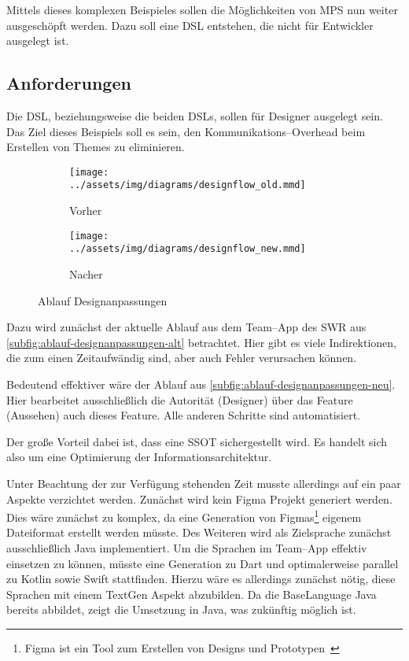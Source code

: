 Mittels dieses komplexen Beispieles sollen die Möglichkeiten von \ac{MPS} nun weiter ausgeschöpft werden.
Dazu soll eine \ac{DSL} entstehen, die nicht für Entwickler ausgelegt ist.

\subsection{Anforderungen}\label{subsec:anforderungen}
Die \ac{DSL}, beziehungsweise die beiden \acp{DSL}, sollen für Designer ausgelegt sein.
Das Ziel dieses Beispiels soll es sein, den Kommunikations--Overhead beim Erstellen von Themes zu eliminieren.
\begin{figure}[ht]
    \begin{subfigure}[c]{0.5\textwidth}
        \begin{center}
            \texttt{[image: ../assets/img/diagrams/designflow\_old.mmd]}
        \end{center}
        \caption{Vorher}
        \label{subfig:ablauf-designanpassungen-alt}
    \end{subfigure}
    \begin{subfigure}[c]{0.5\textwidth}
        \begin{center}
            \texttt{[image: ../assets/img/diagrams/designflow\_new.mmd]}
        \end{center}
        \caption{Nacher}
        \label{subfig:ablauf-designanpassungen-neu}
    \end{subfigure}
    \caption{Ablauf Designanpassungen}
    \label{fig:ablauf-designanpassungen}
\end{figure}

Dazu wird zunächst der aktuelle Ablauf aus dem Team--App des \ac{SWR} aus \autoref{subfig:ablauf-designanpassungen-alt} betrachtet.
Hier gibt es viele Indirektionen, die zum einen Zeitaufwändig sind, aber auch Fehler verursachen können.

Bedeutend effektiver wäre der Ablauf aus \autoref{subfig:ablauf-designanpassungen-neu}.
Hier bearbeitet ausschließlich die Autorität (Designer) über das Feature (Aussehen) auch dieses Feature.
Alle anderen Schritte sind automatisiert.

Der große Vorteil dabei ist, dass eine \ac{SSOT} sichergestellt wird.
Es handelt sich also um eine Optimierung der Informationsarchitektur.

Unter Beachtung der zur Verfügung stehenden Zeit musste allerdings auf ein paar Aspekte verzichtet werden.
Zunächst wird kein Figma Projekt generiert werden.
Dies wäre zunächst zu komplex, da eine Generation von Figmas\footnote{Figma ist ein Tool zum Erstellen von Designs und Prototypen~\autocite{figma-inc-no-date}} eigenem Dateiformat erstellt werden müsste.
Des Weiteren wird als Zielsprache zunächst ausschließlich Java implementiert.
Um die Sprachen im Team--App effektiv einsetzen zu können, müsste eine Generation zu Dart und optimalerweise parallel zu Kotlin sowie Swift stattfinden.
Hierzu wäre es allerdings zunächst nötig, diese Sprachen mit einem TextGen Aspekt abzubilden.
Da die BaseLanguage Java bereits abbildet, zeigt die Umsetzung in Java, was zukünftig möglich ist.

